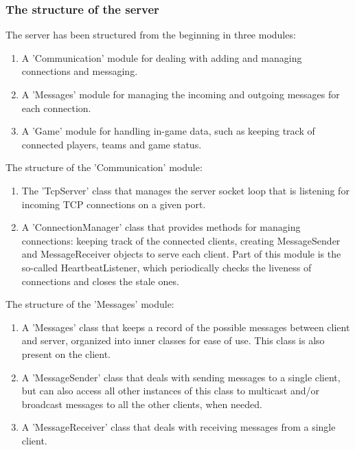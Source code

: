 \subsubsection{The structure of the server}
 
The server has been structured from the beginning in three modules: 

\begin{enumerate}
  
  \item A 'Communication' module for dealing with adding and managing
  connections and messaging.
  
  \item A 'Messages' module for managing the incoming and outgoing messages for
  each connection.
  
  \item A 'Game' module for handling in-game data, such as keeping track of
  connected players, teams and game status. 
  
\end{enumerate}

The structure of the 'Communication' module:

\begin{enumerate}
  
  \item The 'TcpServer' class that manages the server socket loop that is
  listening for incoming TCP connections on a given port.
	
  \item A 'ConnectionManager' class that provides methods for managing
  connections: keeping track of the connected clients, creating MessageSender
  and MessageReceiver objects to serve each client. Part of this
  module is the so-called HeartbeatListener, which periodically checks the
  liveness of connections and closes the stale ones.
  
\end{enumerate}

The structure of the 'Messages' module:

\begin{enumerate}
  
  \item A 'Messages' class that keeps a record of the possible messages between
  client and server, organized into inner classes for ease of use. This class is
  also present on the client.
  
  \item A 'MessageSender' class that deals with sending messages to a single
  client, but can also access all other instances of this class to multicast
  and/or broadcast messages to all the other clients, when needed.
  
  \item A 'MessageReceiver' class that deals with receiving messages from a
  single client.
  
\end{enumerate}

